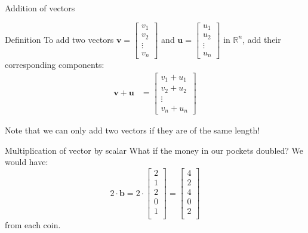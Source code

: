 \documentclass{beamer}
\begin{document}
\begin{frame}{Addition of vectors}
  \begin{block}{Definition}
  To add two vectors \( \mathbf{v} = \begin{bmatrix} v_1 \\ v_2 \\ \vdots \\ v_n \end{bmatrix} \) and \( \mathbf{u} = \begin{bmatrix} u_1 \\ u_2 \\ \vdots \\ u_n \end{bmatrix} \) in \( \mathbb{R}^n \), add their corresponding components:
  \begin{align*}
    \mathbf{v} + \mathbf{u} &= \begin{bmatrix} v_1 + u_1 \\ v_2 + u_2 \\ \vdots \\ v_n + u_n \end{bmatrix}
  \end{align*}
\end{block}

\pause Note that we can only add two vectors if they are of the same length!

\end{frame}


\begin{frame}{Multiplication of vector by scalar}
What if the money in our pockets doubled? 
\pause We would have:
$$2 \cdot \mathbf{b} = 2\cdot \begin{bmatrix}
2 \\1 \\2 \\0 \\1 \\
\end{bmatrix} = \begin{bmatrix}
4 \\2 \\4 \\0 \\2 \\
\end{bmatrix} $$
from each coin.

\end{frame}
\end{document}
